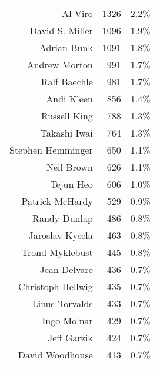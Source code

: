 \documentclass[final]{ols}
\begin{document}
\begin{table}[btph]
\begin{center}
\begin{small}
\newlength{\jwlNL}
\setlength{\jwlNL}{0.4\columnwidth}
\newlength{\jwlCL}
\setlength{\jwlCL}{0.18\columnwidth}
\begin{tabular}{|r|r|r|}
\hline
\multicolumn{1}{|p{\jwlNL}|}{\raisebox{-3ex}{Name}} & 
\multicolumn{1}{|p{\jwlCL}|}{\centering{Number of Changes}}  & 
\multicolumn{1}{|p{\jwlCL}|}{\centering{\vspace{-0.3ex}Percent of Total}} \\
\hline
\hline
\rule[-0.1ex]{0pt}{2.5ex}Al Viro                  & 1326 & 2.2\% \\
David S. Miller          & 1096 & 1.9\% \\
Adrian Bunk              & 1091 & 1.8\% \\
Andrew Morton            &  991 & 1.7\% \\
Ralf Baechle             &  981 & 1.7\% \\
Andi Kleen               &  856 & 1.4\% \\
Russell King             &  788 & 1.3\% \\
Takashi Iwai             &  764 & 1.3\% \\
Stephen Hemminger        &  650 & 1.1\% \\
Neil Brown               &  626 & 1.1\% \\
\hline
\rule[-0.1ex]{0pt}{2.5ex}Tejun Heo                &  606 & 1.0\% \\
Patrick McHardy          &  529 & 0.9\% \\
Randy Dunlap             &  486 & 0.8\% \\
Jaroslav Kysela          &  463 & 0.8\% \\
Trond Myklebust          &  445 & 0.8\% \\
Jean Delvare             &  436 & 0.7\% \\
Christoph Hellwig        &  435 & 0.7\% \\
Linus Torvalds           &  433 & 0.7\% \\
Ingo Molnar              &  429 & 0.7\% \\
Jeff Garzik              &  424 & 0.7\% \\
\hline
\rule[-0.1ex]{0pt}{2.5ex}David Woodhouse          &  413 & 0.7\% \\

\end{tabular}
\end{small}
\end{center}
\end{table}
\end{document}
